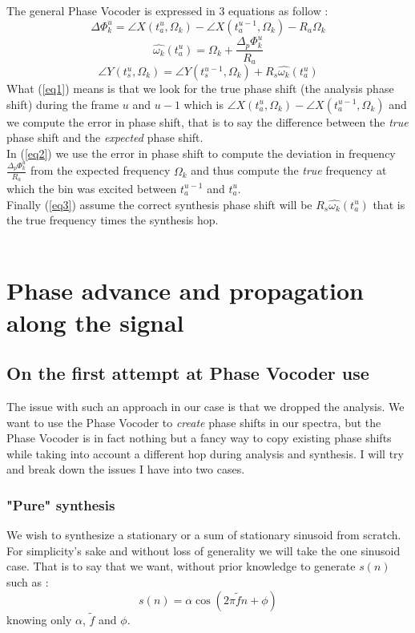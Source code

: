 \documentclass[]{article}
\begin{document}
The general Phase Vocoder is expressed in 3 equations as follow :
\begin{equation}\label{eq1}
\Delta \Phi_{k}^{u} = \angle X(t_a^u, \Omega_k) - \angle X(t_a^{u-1}, \Omega_k) - R_a \Omega_k
\end{equation}
\begin{equation}\label{eq2}
\hat{\omega_k}(t_a^u) = \Omega_k + \frac{\Delta_p \Phi_{k}^u}{R_a}
\end{equation}
\begin{equation}\label{eq3}
\angle Y(t_s^u, \Omega_k) = \angle Y(t_s^{u-1}, \Omega_k) + R_s \hat{\omega_k}(t_a^u)
\end{equation}
What (\ref{eq1}) means is that we look for the true phase shift (the analysis phase shift) during the frame $u$ and $u-1$ which is $\angle X(t_a^u, \Omega_k) - \angle X(t_a^{u-1}, \Omega_k)$ and we compute the error in phase shift, that is to say the difference between the \emph{true} phase shift and the \emph{expected} phase shift.\\
In (\ref{eq2}) we use the error in phase shift to compute the deviation in frequency $\frac{\Delta_p \Phi_{k}^u}{R_a}$ from the expected frequency $\Omega_k$ and thus compute the \emph{true} frequency at which the bin was excited between $t_a^{u-1}$ and $t_a^{u}$.\\
Finally (\ref{eq3}) assume the correct synthesis phase shift will be $R_s\hat{\omega_k}(t_a^u)$ that is the true frequency times the synthesis hop.\\
\\

\section{Phase advance and propagation along the signal}\label{phase-advance}
\subsection{On the first attempt at Phase Vocoder use}
The issue with such an approach in our case is that we dropped the analysis. We want to use the Phase Vocoder to \emph{create} phase shifts in our spectra, but the Phase Vocoder is in fact nothing but a fancy way to copy existing phase shifts while taking into account a different hop during analysis and synthesis. I will try and break down the issues I have into two cases.


\subsubsection{"Pure" synthesis}\label{puresynth}
We wish to synthesize a stationary or a sum of stationary sinusoid from scratch. For simplicity's sake and without loss of generality we will take the one sinusoid case.
That is to say that we want, without prior knowledge to generate $s(n)$ such as :
\begin{equation}\label{statSignal}
s(n) = \alpha \cos(2\pi\tilde{f} n + \phi)
\end{equation}
knowing only $\alpha$, $\tilde{f}$ and $\phi$.\\
\end{document}
